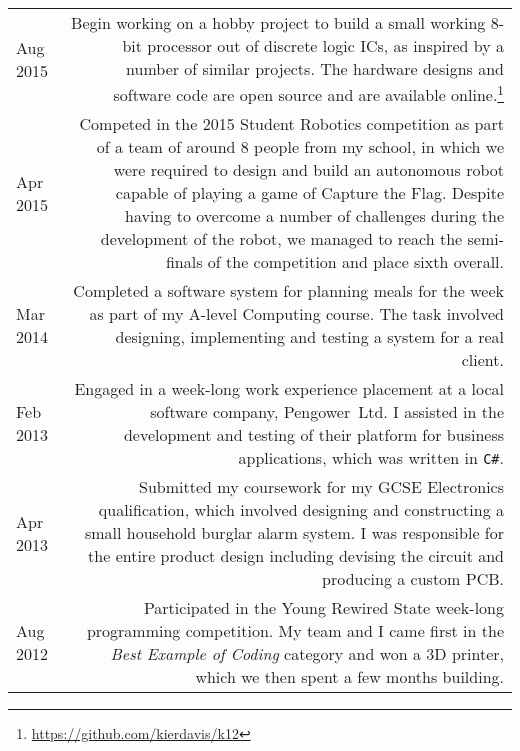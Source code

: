 
\begin{longtable}{L!{\sep}R}
    Aug 2015 &
    Begin working on a hobby project to build a small working 8-bit processor out of discrete logic ICs, as inspired by a number of similar projects. The hardware designs and software code are open source and are available online.\footnote{\url{https://github.com/kierdavis/k12}}
    \vspace{1.2em} \\

    Apr 2015 &
    Competed in the 2015 Student Robotics competition as part of a team of around 8 people from my school, in which we were required to design and build an autonomous robot capable of playing a game of Capture the Flag. Despite having to overcome a number of challenges during the development of the robot, we managed to reach the semi-finals of the competition and place sixth overall.
    \vspace{1.2em} \\

    Mar 2014 &
    Completed a software system for planning meals for the week as part of my A-level Computing course. The task involved designing, implementing and testing a system for a real client.
    \vspace{1.2em} \\


    Feb 2013 &
    Engaged in a week-long work experience placement at a local software company, \mbox{Pengower Ltd}. I assisted in the development and testing of their platform for business applications, which was written in \texttt{C\#}.
    \vspace{1.2em} \\

    Apr 2013 &
    Submitted my coursework for my GCSE Electronics qualification, which involved designing and constructing a small household burglar alarm system. I was responsible for the entire product design including devising the circuit and producing a custom PCB.
    \vspace{1.2em} \\

    Aug 2012 &
    Participated in the Young Rewired State week-long programming competition. My team and I came first in the \emph{Best Example of Coding} category and won a 3D printer, which we then spent a few months building.
    \vspace{1.2em} \\


\end{longtable}
